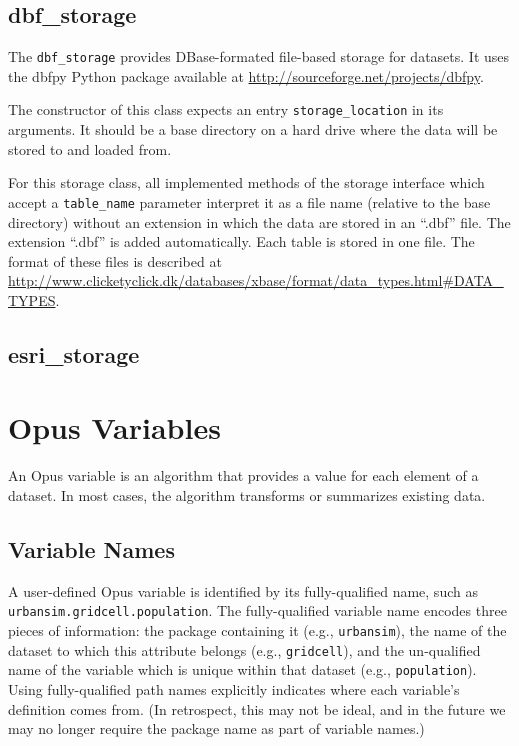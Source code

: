 {\subsection{dbf_storage}
%
The \verb|dbf_storage| provides DBase-formated file-based storage for
datasets.  It uses the dbfpy Python package available at
\url{http://sourceforge.net/projects/dbfpy}.

The constructor of this class expects an entry \verb|storage_location| in its
arguments. It should be a base directory on a hard drive where
the data will be stored to and loaded from.

For this storage class, all implemented methods of the storage interface which
accept a \verb|table_name| parameter interpret it as a file name (relative to the
base directory) without an extension in which the data are stored in an ``.dbf''
file.  The extension ``.dbf'' is added automatically. Each table is stored in one
file. The format of these files is described at
\url{http://www.clicketyclick.dk/databases/xbase/format/data_types.html\#DATA_TYPES}.

\subsection{esri_storage}
%

\section{Opus Variables} 
\label{sec:opus-variable}
\variablesindex

An Opus variable \variablesindex is an algorithm that provides a value for
each element of a dataset. \datasetindex In most cases, the algorithm
transforms or summarizes existing data.

\subsection{Variable Names}
\label{sec:variable-names}
\variablesindex

A user-defined Opus variable \variablesindex is identified by its
fully-qualified name, such as \verb|urbansim.gridcell.population|.  The
fully-qualified variable \variablesindex name encodes three pieces of
information: the package containing it (e.g., \verb|urbansim|), the name of
the dataset \datasetindex to which this attribute \attributesindex belongs
(e.g., \verb|gridcell|), and the un-qualified name of the variable
\variablesindex which is unique within that dataset \datasetindex (e.g.,
\verb|population|).  Using fully-qualified path names explicitly indicates where
each variable's definition comes from.  (In retrospect, this may not be
ideal, and in the future we may no longer require the package name as part
of variable names.)

}
